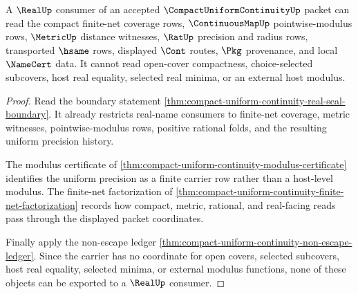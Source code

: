 \begin{theorem}
\label{thm:compact-uniform-continuity-realup-consumer-boundary}
A $\RealUp$ consumer of an accepted $\CompactUniformContinuityUp$ packet can read the compact finite-net coverage rows, $\ContinuousMapUp$ pointwise-modulus rows, $\MetricUp$ distance witnesses, $\RatUp$ precision and radius rows, transported $\hsame$ rows, displayed $\Cont$ routes, $\Pkg$ provenance, and local $\NameCert$ data. It cannot read open-cover compactness, choice-selected subcovers, host real equality, selected real minima, or an external host modulus.
\end{theorem}
\begin{proof}
Read the boundary statement \autoref{thm:compact-uniform-continuity-real-seal-boundary}. It already restricts real-name consumers to finite-net coverage, metric witnesses, pointwise-modulus rows, positive rational folds, and the resulting uniform precision history.

The modulus certificate of \autoref{thm:compact-uniform-continuity-modulus-certificate} identifies the uniform precision as a finite carrier row rather than a host-level modulus. The finite-net factorization of \autoref{thm:compact-uniform-continuity-finite-net-factorization} records how compact, metric, rational, and real-facing reads pass through the displayed packet coordinates.

Finally apply the non-escape ledger \autoref{thm:compact-uniform-continuity-non-escape-ledger}. Since the carrier has no coordinate for open covers, selected subcovers, host real equality, selected minima, or external modulus functions, none of these objects can be exported to a $\RealUp$ consumer.
\end{proof}

